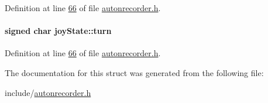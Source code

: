Definition at line \hyperlink{autonrecorder_8h_source_l00066}{66} of file \hyperlink{autonrecorder_8h_source}{autonrecorder.\+h}.

\paragraph[{\texorpdfstring{turn}{turn}}]{\setlength{\rightskip}{0pt plus 5cm}signed char joy\+State\+::turn}\hypertarget{structjoy_state_aacdbb758b97190220423402f63020483}{}\label{structjoy_state_aacdbb758b97190220423402f63020483}


Definition at line \hyperlink{autonrecorder_8h_source_l00066}{66} of file \hyperlink{autonrecorder_8h_source}{autonrecorder.\+h}.



The documentation for this struct was generated from the following file\+:\begin{DoxyCompactItemize}
\item 
include/\hyperlink{autonrecorder_8h}{autonrecorder.\+h}\end{DoxyCompactItemize}
